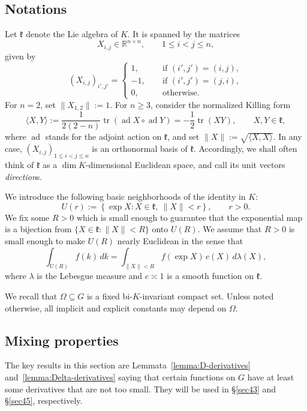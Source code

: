 \documentclass[11pt,oneside]{amsart}
\numberwithin{equation}{section}
\theoremstyle{remark}
\theoremstyle{plain}
\DeclareMathOperator{\ad}{ad}
\DeclareMathOperator{\tr}{tr}
\newcommand\RR{\mathbb{R}}
\newcommand\mfk{\mathfrak{k}}
\renewcommand\leq{\leqslant}
\renewcommand\geq{\geqslant}
\begin{document}
\subsection{Notations}
Let $\mfk$ denote the Lie algebra of $K$. It is spanned by the matrices 
\[X_{i,j}\in\RR^{n\times n},\qquad 1\leq i<j\leq n,\]
given by
\[
(X_{i,j})_{i',j'}=\begin{cases}1,\qquad&\text{if $(i',j')=(i,j)$},
\\ -1,&\text{if $(i',j')=(j,i)$}, 
\\ 0, &\text{otherwise}.
\end{cases}
\]
For $n=2$, set $\|X_{1,2}\|:=1$. For $n\geq 3$, consider the normalized Killing form
\[
\langle X,Y\rangle :=\frac{1}{2(2-n)} \tr(\ad X \circ \ad Y)=-\frac{1}{2}\tr(XY), \qquad X,Y\in\mfk,
\]
where $\ad$ stands for the adjoint action on $\mfk$, and set $\|X\|:=\sqrt{\langle X, X\rangle}$. In any case, $(X_{i,j})_{1\leq i<j\leq n}$ is an orthonormal basis of $\mfk$. Accordingly, we shall often think of $\mfk$ as a $\dim K$-dimensional Euclidean space, and call its unit vectors \emph{direction}s.

We introduce the following basic neighborhoods of the identity in $K$:
\begin{equation}\label{defU}
U(r):=\left\{\exp X: X\in\mfk,\ \|X\|<r\right\}, \qquad r>0.
\end{equation}
We fix some $R>0$ which is small enough to guarantee that the exponential map is a bijection from $\{X\in\mfk:\|X\|<R\}$ onto $U(R)$. We assume that $R>0$ is small enough to make $U(R)$ nearly Euclidean in the sense that
\begin{equation}\label{eq:lebesgue-haar}
\int_{U(R)} f(k) \,dk = \int_{\|X\|<R} f(\exp X)\, c(X)\,d\lambda(X),
\end{equation}
where $\lambda$ is the Lebesgue measure and $c\asymp 1$ is a smooth function on $\mfk$.

We recall that $\Omega \subseteq G$ is a fixed bi-$K$-invariant compact set. Unless noted otherwise, all implicit and explicit constants may depend on $\Omega$.

\subsection{Mixing properties}
The key results in this section are Lemmata~\ref{lemma:D-derivatives} and~\ref{lemma:Delta-derivatives} saying that certain functions on $G$ have at least some derivatives that are not too small. They will be used in \S\ref{sec43} and \S\ref{sec45}, respectively.
\end{document}
